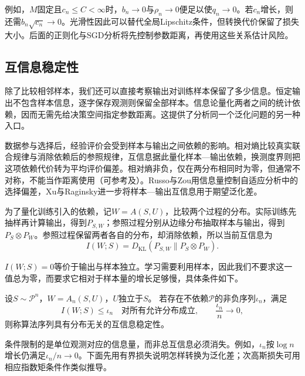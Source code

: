例如，$M$固定且$c_n\leq C<\infty$时，$b_n\to0$与$\rho_n\to0$便足以使$q_n\to0$。若$c_n$增长，则还需$b_n\sqrt{c_n}\to0$。光滑性因此可以替代全局Lipschitz条件，但转换代价保留了损失大小。后面的正则化与SGD分析将先控制参数距离，再使用这些关系估计风险。

\subsection{互信息稳定性}
\label{sec:information-stability}

除了比较相邻样本，我们还可以直接考察输出对训练样本保留了多少信息。恒定输出不包含样本信息，逐字保存观测则保留全部样本。信息论量化两者之间的统计依赖，因而无需先给决策空间指定参数距离。这提供了分析同一个泛化问题的另一种入口。

数据参与选择后，经验评价会受到样本与输出之间依赖的影响。相对熵比较真实联合规律与消除依赖后的参照规律，互信息据此量化样本—输出依赖，换测度界则把这项依赖代价转为平均评价偏差。相对熵非负，仅在两分布相同时为零，但通常不对称，不能当作距离使用（可参考及）。Russo与Zou用信息量控制自适应分析中的选择偏差，Xu与Raginsky进一步将样本—输出互信息用于期望泛化差。

为了量化训练引入的依赖，记$W=A(S,U)$，比较两个过程的分布。实际训练先抽样再计算输出，得到$P_{S,W}$；参照过程分别从边缘分布抽取样本与输出，得到$P_S\otimes P_W$。参照过程保留两者各自的分布，却消除依赖，所以当前互信息为
\[
 I(W;S)=D_{\mathrm{KL}}(P_{S,W}\|P_S\otimes P_W).
\]

$I(W;S)=0$等价于输出与样本独立。学习需要利用样本，因此我们不要求这一值总为零，而要求它相对于样本量的增长足够慢，具体条件如下。

\begin{definition}[互信息稳定性]
\label{def:mutual-information-stability}
设$S\sim\mathcal P^n$，$W=A_n(S,U)$，$U$独立于$S$。
若存在不依赖$\mathcal P$的非负序列$\iota_n$，满足
\[
 I(W;S)\leq\iota_n\quad\text{对所有允许分布成立},
 \qquad \frac{\iota_n}{n}\longrightarrow0,
\]
则称算法序列具有分布无关的互信息稳定性。
\end{definition}

条件限制的是单位观测对应的信息量，而非总互信息必须消失。例如，$\iota_n$按$\log n$增长仍满足$\iota_n/n\to0$。下面先用有界损失说明怎样转换为泛化差；次高斯损失可用相应指数矩条件作类似推导。

